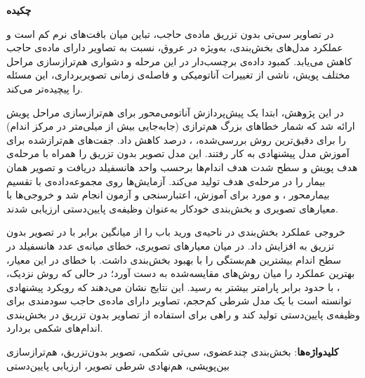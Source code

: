 

\begin{center}
\textbf{چکیده}
\end{center}

در تصاویر سی‌تی بدون تزریق ماده‌ی حاجب، تباین میان بافت‌های نرم کم است و عملکرد مدل‌های بخش‌بندی، به‌ویژه در عروق، نسبت به تصاویر دارای ماده‌ی حاجب کاهش می‌یابد. کمبود داده‌ی برچسب‌دار در این مرحله و دشواری هم‌ترازسازی مراحل مختلف پویش، ناشی از تغییرات آناتومیکی و فاصله‌ی زمانی تصویربرداری، این مسئله را پیچیده‌تر می‌کند.

در این پژوهش، ابتدا یک پیش‌پردازش آناتومی‌محور برای هم‌ترازسازی مراحل پویش ارائه شد که شمار خطاهای بزرگ هم‌ترازی (جابه‌جایی بیش از  میلی‌متر در مرکز اندام) را برای دقیق‌ترین روش بررسی‌شده، ،  درصد کاهش داد. جفت‌های هم‌ترازشده برای آموزش مدل پیشنهادی  به کار رفتند. این مدل تصویر بدون تزریق را همراه با مرحله‌ی هدف پویش و سطح شدت هدف اندام‌ها برحسب واحد هانسفیلد دریافت و تصویر همان بیمار را در مرحله‌ی هدف تولید می‌کند. آزمایش‌ها روی مجموعه‌داده‌ی  با تقسیم بیمارمحور ،  و  مورد برای آموزش، اعتبارسنجی و آزمون انجام شد و خروجی‌ها با معیارهای تصویری و بخش‌بندی خودکار به‌عنوان وظیفه‌ی پایین‌دستی ارزیابی شدند.

خروجی  عملکرد بخش‌بندی در ناحیه‌ی ورید باب را از میانگین  برابر با  در تصویر بدون تزریق به  افزایش داد. در میان معیارهای تصویری، خطای میانه‌ی عدد هانسفیلد در سطح اندام بیشترین هم‌بستگی را با بهبود بخش‌بندی داشت.  با خطای   در این معیار، بهترین عملکرد را میان روش‌های مقایسه‌شده به دست آورد؛ در حالی که روش نزدیک، ، با حدود  برابر پارامتر بیشتر به   رسید. این نتایج نشان می‌دهند که رویکرد پیشنهادی توانسته است با یک مدل شرطی کم‌حجم، تصاویر دارای ماده‌ی حاجب سودمندی برای وظیفه‌ی پایین‌دستی تولید کند و راهی برای استفاده از تصاویر بدون تزریق در بخش‌بندی اندام‌های شکمی بردارد.


\bigskip\noindent\textbf{کلیدواژه‌ها}:
بخش‌بندی چندعضوی، سی‌تی شکمی، تصویر بدون‌تزریق، هم‌ترازسازی بین‌پویشی، هم‌نهادی شرطی تصویر، ارزیابی پایین‌دستی
